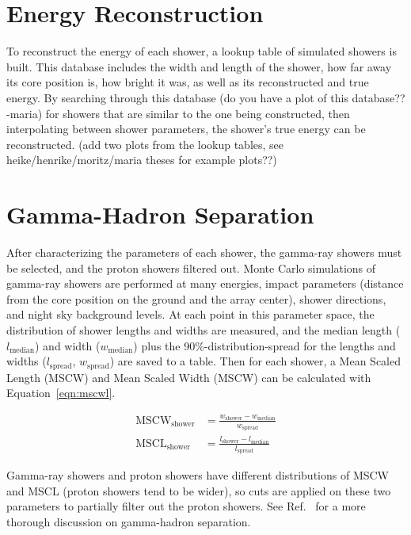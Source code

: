 \section{Energy Reconstruction}\label{subsec:enrecon}
  To reconstruct the energy of each shower, a lookup table of simulated showers is built.
This database includes the width and length of the shower, how far away its core position is, how bright it was, as well as its reconstructed and true energy.
  By searching through this {\color{red}database (do you have a plot of this database?? -maria)} for showers that are similar to the one being constructed, then interpolating between shower parameters, the shower's true energy can be reconstructed.
  {\color{red}(add two plots from the lookup tables, see heike/henrike/moritz/maria theses for example plots??)}

\section{Gamma-Hadron Separation}

After characterizing the parameters of each shower, the gamma-ray showers must be selected, and the proton showers filtered out.
Monte Carlo simulations of gamma-ray showers are performed at many energies, impact parameters (distance from the core position on the ground and the array center), shower directions, and night sky background levels.
At each point in this parameter space, the distribution of shower lengths and widths are measured, and the median length ($l_{\textrm{median}}$) and width ($w_{\textrm{median}}$) plus the 90\%-distribution-spread for the lengths and widths ($l_{\textrm{spread}}$, $w_{\textrm{spread}}$) are saved to a table.
Then for each shower, a Mean Scaled Length (MSCW) and Mean Scaled Width (MSCW) can be calculated with Equation~\ref{eqn:mscwl}.

\begin{equation}\label{eqn:mscwl}
  \begin{split}
    \textrm{MSCW}_{\textrm{shower}} & = \frac{w_{\textrm{shower}}-w_{\textrm{median}}}{w_{\textrm{spread}}} \\
    \textrm{MSCL}_{\textrm{shower}} & = \frac{l_{\textrm{shower}}-l_{\textrm{median}}}{l_{\textrm{spread}}}
  \end{split}
\end{equation}

Gamma-ray showers and proton showers have different distributions of MSCW and MSCL (proton showers tend to be wider), so cuts are applied on these two parameters to partially filter out the proton showers.
See Ref.~\cite{Krause2017} for a more thorough discussion on gamma-hadron separation.

